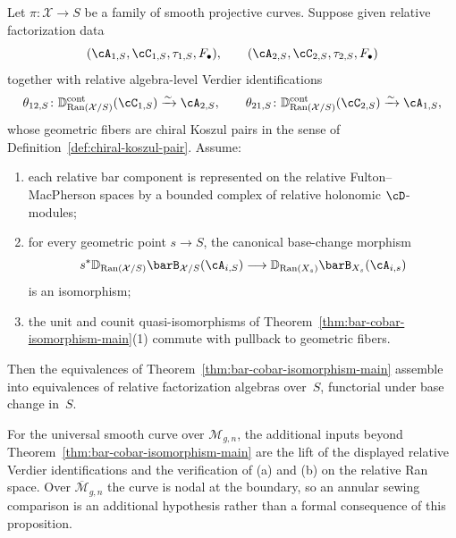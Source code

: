 \begin{proposition}
\label{prop:bar-cobar-relative-extension}
Let $\pi \colon \mathcal{X} \to S$ be a family of smooth projective
curves. Suppose given relative factorization data
\[
(\cA_{1,S}, \cC_{1,S}, \tau_{1,S}, F_\bullet),
\qquad
(\cA_{2,S}, \cC_{2,S}, \tau_{2,S}, F_\bullet)
\]
together with relative algebra-level Verdier identifications
\[
\theta_{12,S}\colon
\mathbb{D}_{\operatorname{Ran}(\mathcal{X}/S)}^{\mathrm{cont}}(\cC_{1,S})
\xrightarrow{\sim}\cA_{2,S},
\qquad
\theta_{21,S}\colon
\mathbb{D}_{\operatorname{Ran}(\mathcal{X}/S)}^{\mathrm{cont}}(\cC_{2,S})
\xrightarrow{\sim}\cA_{1,S},
\]
whose geometric fibers are chiral Koszul pairs in the sense of
Definition~\textup{\ref{def:chiral-koszul-pair}}. Assume:
\begin{enumerate}[label=\textup{(\alph*)}]
\item each relative bar component is represented on the relative
 Fulton--MacPherson spaces by a bounded complex of relative
 holonomic $\cD$-modules;
\item for every geometric point $s \to S$, the canonical base-change
 morphism
 \[
 s^* \mathbb{D}_{\operatorname{Ran}(\mathcal{X}/S)}
 \barB_{\mathcal{X}/S}(\cA_{i,S})
 \longrightarrow
 \mathbb{D}_{\operatorname{Ran}(X_s)}
 \barB_{X_s}(\cA_{i,s})
 \]
 is an isomorphism;
\item the unit and counit quasi-isomorphisms of
 Theorem~\ref{thm:bar-cobar-isomorphism-main}\textup{(1)} commute
 with pullback to geometric fibers.
\end{enumerate}
Then the equivalences of
Theorem~\ref{thm:bar-cobar-isomorphism-main} assemble into
equivalences of relative factorization algebras over~$S$, functorial
under base change in~$S$.

For the universal smooth curve over $\mathcal{M}_{g,n}$, the additional
inputs beyond Theorem~\ref{thm:bar-cobar-isomorphism-main} are the lift
of the displayed relative Verdier identifications and the verification
of \textup{(a)} and \textup{(b)} on the relative Ran space. Over
$\overline{\mathcal{M}}_{g,n}$ the curve is nodal at the boundary, so an
annular sewing comparison is an additional hypothesis rather than a
formal consequence of this proposition.
\end{proposition}


